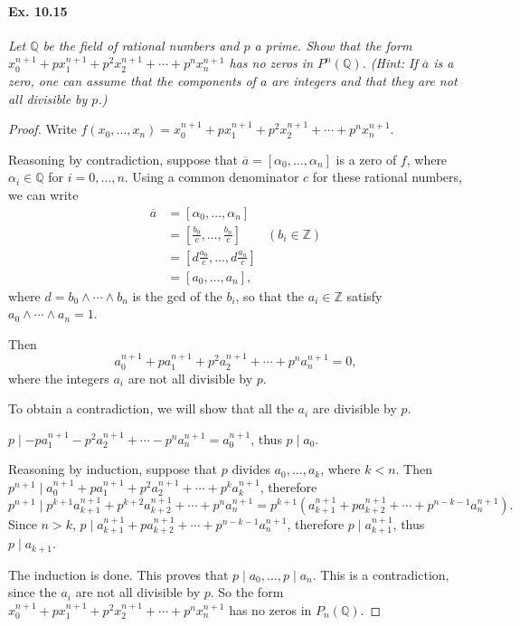 \documentclass[11pt,a4paper]{article}
\newcommand{\Q}{\mathbb{Q}}
\newcommand{\Z}{\mathbb{Z}}
\begin{document}
\paragraph{Ex. 10.15} {\it Let $\Q$ be the field of rational numbers and $p$ a prime. Show that the form $x_0^{n+1} + p x_1^{n+1} + p^2 x_2^{n+1} + \cdots + p^n x_n^{n+1}$ has no zeros in $P^n(\Q)$. (Hint: If $\overline{a}$ is a zero, one can assume that the components of $a$ are integers and that they are not all divisible by $p$.)
}
\begin{proof}
Write $f(x_0,\ldots,x_n) = x_0^{n+1} + p x_1^{n+1} + p^2 x_2^{n+1} + \cdots + p^n x_n^{n+1}$.

Reasoning by contradiction, suppose that $\overline{a} = [\alpha_0,\ldots,\alpha_n]$ is a zero of $f$, where $\alpha_i \in \Q$ for $i=0,\ldots,n$. Using a common denominator $c$ for these rational numbers, we can write
\begin{align*}
\overline{a} &= [\alpha_0,\ldots,\alpha_n]\\
&= \left[\frac{b_0}{c},\ldots, \frac{b_n}{c}\right] \qquad (b_i \in \Z)\\
&= \left[d \frac{a_0}{c},\ldots,d \frac{a_n}{c}\right]\\
 &=  [a_0,\ldots,a_n],
\end{align*}
where $d =b_0\wedge \cdots \wedge b_n$ is the gcd of the $b_i$, so that the $a_i \in \Z$ satisfy $a_0 \wedge \cdots \wedge a_n = 1$.

Then 
$$a_0^{n+1} + p a_1^{n+1} + p^2 a_2 ^{n+1} + \cdots + p^n a_n^{n+1} = 0,$$
where the integers $a_i$ are not all divisible by $p$.

To obtain a contradiction, we will show that all the $a_i$ are divisible by $p$.

$p \mid - p a_1^{n+1} - p^2 a_2 ^{n+1} + \cdots - p^n a_n^{n+1} = a_0^{n+1}$, thus $p \mid a_0$.

Reasoning by induction, suppose that $p$ divides $a_0,\ldots,a_k$, where $k<n$. Then $p^{n+1} \mid a_0^{n+1} + p a_1^{n+1} + p^2 a_2 ^{n+1} + \cdots + p^k a_k^{n+1}$, therefore
$$p^{n+1} \mid  p^{k+1} a_{k+1} ^{n+1} + p^{k+2} a_{k+2}^{n+1} +\cdots + p^n a_n^{n+1} = p^{k+1}(a_{k+1}^{n+1} + p a_{k+2}^{n+1} + \cdots + p^{n-k-1}a_n^{n+1}).$$
Since $n>k$, $ p \mid a_{k+1}^{n+1} + p a_{k+2}^{n+1} + \cdots + p^{n-k-1}a_n^{n+1}$, therefore $p \mid a_{k+1}^{n+1}$, thus $p \mid a_{k+1}$.

The induction is done. This proves that $p\mid a_0, \ldots, p \mid a_n$. This is a contradiction, since the $a_i$ are not all divisible by $p$. So the form $x_0^{n+1} + p x_1^{n+1} + p^2 x_2^{n+1} + \cdots + p^n x_n^{n+1}$ has no zeros in $P_n(\Q)$.
\end{proof}
\end{document}

